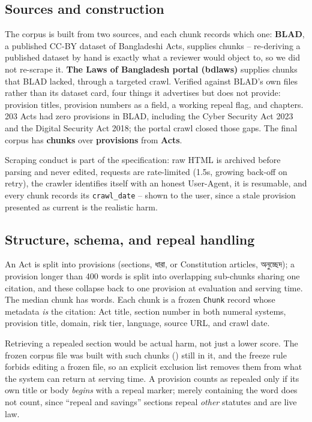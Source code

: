\documentclass[10pt,a4paper]{article}
\newcommand{\bng}[1]{{\bn #1}}
\begin{document}
\subsection{Sources and construction}
The corpus is built from two sources, and each chunk records which one: \textbf{BLAD}, a published CC-BY dataset of Bangladeshi Acts, supplies \nBladChunks{} chunks -- re-deriving a published dataset by hand is exactly what a reviewer would object to, so we did not re-scrape it. \textbf{The Laws of Bangladesh portal (bdlaws)} supplies \nBdlawsChunks{} chunks that BLAD lacked, through a targeted crawl. Verified against BLAD's own files rather than its dataset card, four things it advertises but does not provide: provision titles, provision numbers as a field, a working repeal flag, and chapters. 203 Acts had zero provisions in BLAD, including the Cyber Security Act 2023 and the Digital Security Act 2018; the portal crawl closed those gaps. The final corpus has \textbf{\nChunks{} chunks} over \textbf{\nProvisions{} provisions} from \textbf{\nActs{} Acts}.

Scraping conduct is part of the specification: raw HTML is archived before parsing and never edited, requests are rate-limited (1.5s, growing back-off on retry), the crawler identifies itself with an honest User-Agent, it is resumable, and every chunk records its \texttt{crawl\_date} -- shown to the user, since a stale provision presented as current is the realistic harm.

\subsection{Structure, schema, and repeal handling}
An Act is split into provisions (sections, \bng{ধারা}, or Constitution articles, \bng{অনুচ্ছেদ}); a provision longer than 400 words is split into overlapping sub-chunks sharing one citation, and these collapse back to one provision at evaluation and serving time. The median chunk has \medianWords{} words. Each chunk is a frozen \texttt{Chunk} record whose metadata \emph{is} the citation: Act title, section number in both numeral systems, provision title, domain, risk tier, language, source URL, and crawl date.

Retrieving a repealed section would be actual harm, not just a lower score. The frozen corpus file was built with \nExcluded{} such chunks (\pctExcluded{}) still in it, and the freeze rule forbids editing a frozen file, so an explicit exclusion list removes them from what the system can return at serving time. A provision counts as repealed only if its own title or body \emph{begins} with a repeal marker; merely containing the word does not count, since ``repeal and savings'' sections repeal \emph{other} statutes and are live law.
\end{document}
